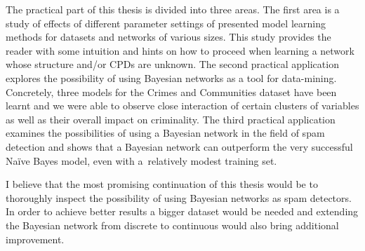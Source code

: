 \documentclass[english,cover]{fitthesis} %
\newcommand{\ignore}[1]{}                  %
\begin{document}
The practical part of this thesis is divided into three areas.
The first area is a study of effects of different parameter settings of presented model learning methods for datasets and networks of various sizes. This study provides the reader with some intuition and hints on how to proceed when learning a network whose structure and/or CPDs are unknown.
The second practical application explores the possibility of using Bayesian networks as a tool for data-mining. Concretely, three models for the Crimes and Communities dataset have been learnt and we were able to observe close interaction of certain clusters of variables as well as their overall impact on criminality.
The third practical application examines the possibilities of using a Bayesian network in the field of spam detection and shows that a Bayesian network can outperform the very successful Naïve Bayes model, even with a~relatively modest training set.

I believe that the most promising continuation of this thesis would be to thoroughly inspect the possibility of using Bayesian networks as spam detectors. In order to achieve better results a bigger dataset would be needed and extending the Bayesian network from discrete to continuous would also bring additional improvement.

\ignore{
\bigskip

My original contributions:
\begin{itemize}
	\item I myself devised some proofs and nice formal theories: Joint probability distribution induces by a BN indeed is a probability distribution (sums to one). Derivation of the formula for weighted sampling. Nice theory for finding all possible alterations of a network (for state-space search in structure learning).
\end{itemize}

What I did in the practical part:
\begin{itemize}
    \item I have demonstrated the analysis which should be performed if our goal is to learn network parameters as accurately as possible. I also examined relation of the ability to learn the \uv{true} structure and dataset size.
    \item A more general Bayesian network can perform better than Naïve Bayes model in context of spam filtering. Supposedly, mostly with large datasets (Bayesian network has higher variance).
\end{itemize}
}









\ifczech
  
\else 
  
%  
\fi
  \begin{flushleft}
  \end{flushleft}
  \appendix
   
\end{document}
